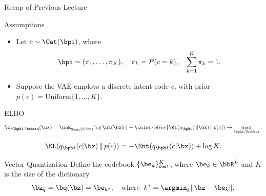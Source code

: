 \documentclass{beamer}
\begin{document}
\begin{frame}{Recap of Previous Lecture}
	\begin{block}{Assumptions}
		\begin{itemize}
			\item Let $c \sim \Cat(\bpi)$, where 
			\vspace{-0.6cm}
			\[
				\bpi = (\pi_1, \dots, \pi_K), \quad \pi_k = P(c = k), \quad \sum_{k=1}^K \pi_k = 1.
			\]
			\vspace{-0.7cm}
			\item Suppose the VAE employs a discrete latent code $c$, with prior $p(c) = \text{Uniform}\{1, \dots, K\}$.
		\end{itemize}
	\end{block}
	\vspace{-0.3cm}
	\begin{block}{ELBO}
		\vspace{-0.7cm}
		\[
			\cL_{\bphi, \btheta}(\bx)  = \bbE_{q_{\bphi}(c| \bx)} \log \pt(\bx| c) - {\color{olive} \KL(q_{\bphi}(c| \bx) \,\|\, p(c))} \rightarrow \max_{\bphi, \btheta}.
		\]
	\end{block}
	\vspace{-1.0cm}
	\[
		\KL(q_{\bphi}(c| \bx) \,\|\, p(c)) = - \Ent(q_{\bphi}(c| \bx)) + \log K. 
	\]		
	\vspace{-0.5cm}
	\begin{block}{Vector Quantization}
		Define the codebook $\{\be_k\}_{k=1}^K$, where $\be_k \in \bbR^L$ and $K$ is the size of the dictionary.
		\vspace{-0.3cm}
		\[
			\bz_q = \bq (\bz) = \be_{k^*}, \quad \text{where}\;\; k^* = \argmin_k \| \bz - \be_k \|.
		\] 
		\vspace{-0.7cm}
	\end{block}
\end{frame}
\end{document}
